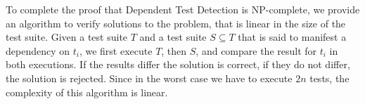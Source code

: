 To complete the proof that Dependent Test Detection is NP-complete, we
provide an algorithm to verify solutions to the problem, that is
linear in the size of the test suite.
Given a test suite $T$ and a test suite $S \subseteq T$ that is said
to manifest a dependency on $t_i$, we first execute $T$, then $S$, and
compare the result for $t_i$ in both executions. 
If the results differ the solution is correct, if they do not differ,
the solution is rejected.
Since in the worst case we have to execute $2n$ tests, the complexity
of this algorithm is linear.










